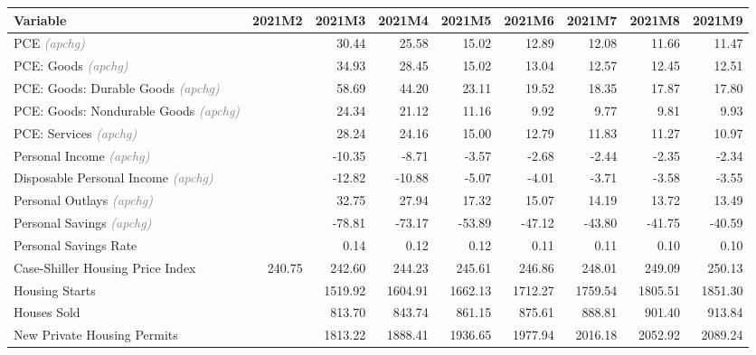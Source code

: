 \documentclass[11pt, letterpaper]{article}\usepackage[]{graphicx}\usepackage[]{color}
\begin{document}
\begin{table}[H]
\centering
\begingroup\fontsize{10pt}{12pt}\selectfont
\begin{tabular}{lrrrrrrrr}
  \hline
Variable & 2021M2 & 2021M3 & 2021M4 & 2021M5 & 2021M6 & 2021M7 & 2021M8 & 2021M9 \\ 
  \hline
PCE \textit{\footnotesize\textcolor{gray}{(apchg)}} &  & 30.44 & 25.58 & 15.02 & 12.89 & 12.08 & 11.66 & 11.47 \\ 
  PCE: Goods \textit{\footnotesize\textcolor{gray}{(apchg)}} &  & 34.93 & 28.45 & 15.02 & 13.04 & 12.57 & 12.45 & 12.51 \\ 
  PCE: Goods: Durable Goods \textit{\footnotesize\textcolor{gray}{(apchg)}} &  & 58.69 & 44.20 & 23.11 & 19.52 & 18.35 & 17.87 & 17.80 \\ 
  PCE: Goods: Nondurable Goods \textit{\footnotesize\textcolor{gray}{(apchg)}} &  & 24.34 & 21.12 & 11.16 & 9.92 & 9.77 & 9.81 & 9.93 \\ 
  PCE: Services \textit{\footnotesize\textcolor{gray}{(apchg)}} &  & 28.24 & 24.16 & 15.00 & 12.79 & 11.83 & 11.27 & 10.97 \\ 
  Personal Income \textit{\footnotesize\textcolor{gray}{(apchg)}} &  & -10.35 & -8.71 & -3.57 & -2.68 & -2.44 & -2.35 & -2.34 \\ 
  Disposable Personal Income \textit{\footnotesize\textcolor{gray}{(apchg)}} &  & -12.82 & -10.88 & -5.07 & -4.01 & -3.71 & -3.58 & -3.55 \\ 
  Personal Outlays \textit{\footnotesize\textcolor{gray}{(apchg)}} &  & 32.75 & 27.94 & 17.32 & 15.07 & 14.19 & 13.72 & 13.49 \\ 
  Personal Savings \textit{\footnotesize\textcolor{gray}{(apchg)}} &  & -78.81 & -73.17 & -53.89 & -47.12 & -43.80 & -41.75 & -40.59 \\ 
  Personal Savings Rate &  & 0.14 & 0.12 & 0.12 & 0.11 & 0.11 & 0.10 & 0.10 \\ 
  Case-Shiller Housing Price Index & 240.75 & 242.60 & 244.23 & 245.61 & 246.86 & 248.01 & 249.09 & 250.13 \\ 
  Housing Starts &  & 1519.92 & 1604.91 & 1662.13 & 1712.27 & 1759.54 & 1805.51 & 1851.30 \\ 
  Houses Sold &  & 813.70 & 843.74 & 861.15 & 875.61 & 888.81 & 901.40 & 913.84 \\ 
  New Private Housing Permits &  & 1813.22 & 1888.41 & 1936.65 & 1977.94 & 2016.18 & 2052.92 & 2089.24 \\ 

\end{tabular}
\end{table}
\end{document}

